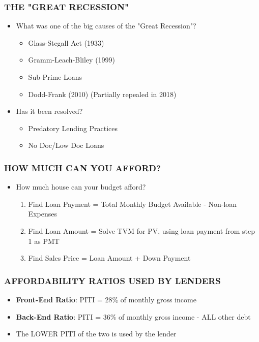 \documentclass[12pt]{article}
\begin{document}
            \subsubsection{THE "GREAT RECESSION"}
                \begin{itemize}
                    \item What was one of the big causes of the "Great Recession"?
                        \begin{itemize}
                            \item Glass-Stegall Act (1933)
                            \item Gramm-Leach-Bliley (1999)
                            \item Sub-Prime Loans
                            \item Dodd-Frank (2010) (Partially repealed in 2018)
                        \end{itemize}
                    \item Has it been resolved?
                        \begin{itemize}
                            \item Predatory Lending Practices
                            \item No Doc/Low Doc Loans
                        \end{itemize}
                \end{itemize}
            \subsubsection{HOW MUCH CAN YOU AFFORD?}
                \begin{itemize}
                    \item How much house can your budget afford?
                        \begin{enumerate}
                            \item Find Loan Payment = Total Monthly Budget Available - Non-loan Expenses
                            \item Find Loan Amount = Solve TVM for PV, using loan payment from step 1 as PMT
                            \item Find Sales Price = Loan Amount + Down Payment
                        \end{enumerate}
                \end{itemize}
            \subsubsection{AFFORDABILITY RATIOS USED BY LENDERS}
                \begin{itemize}
                    \item \textbf{Front-End Ratio}: PITI = 28\% of monthly gross income
                    \item \textbf{Back-End Ratio}: PITI = 36\% of monthly gross income - ALL other debt
                    \item The LOWER PITI of the two is used by the lender
                \end{itemize}
\end{document}
